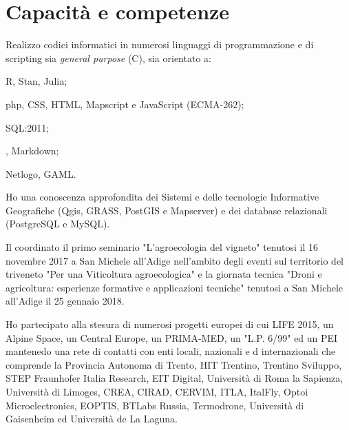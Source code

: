 \documentclass{curriculum}
\begin{document}
    \section{Capacità e competenze}
        Realizzo codici informatici in numerosi linguaggi di programmazione e di scripting sia \textit{general purpose} (C), sia orientato a:
        \begin{description}[labelindent= 1em, labelsep*=0.5em, leftmargin=!, style= standard, font=\normalfont\textit]
            \item[statistica:] R, Stan, Julia;
            \item[web:] php, CSS, HTML, Mapscript e JavaScript (ECMA-262);
            \item[database:] SQL:2011;
            \item[testi:] , Markdown;
            \item[sistemi complessi:] Netlogo, GAML.
        \end{description}
        
        Ho una conoscenza approfondita dei Sistemi e delle tecnologie Informative Geografiche (Qgis, GRASS, PostGIS e Mapserver) e dei database relazionali (PostgreSQL e MySQL). 
        
        Il coordinato il primo seminario "L'agroecologia del vigneto" tenutosi il 16 novembre 2017 a San Michele all'Adige nell'ambito degli eventi sul territorio del triveneto "Per una Viticoltura agroecologica" e la giornata tecnica "Droni e agricoltura: esperienze formative e applicazioni tecniche" tenutosi a San Michele all'Adige il 25 gennaio 2018.
        
        Ho partecipato alla stesura di numerosi progetti europei di cui  LIFE 2015, un Alpine Space, un Central Europe, un PRIMA-MED, un "L.P. 6/99" ed un PEI mantenedo una rete di contatti con enti locali, nazionali e d internazionali che comprende la Provincia Autonoma di Trento, HIT Trentino, Trentino Sviluppo, STEP Fraunhofer Italia Research, EIT Digital, Università di Roma la Sapienza, Università di Limoges, CREA, CIRAD, CERVIM, ITLA, ItalFly, Optoi Microelectronics, EOPTIS, BTLabs Russia, Termodrone, Università di Gaisenheim ed Università de La Laguna.
        
\end{document}
